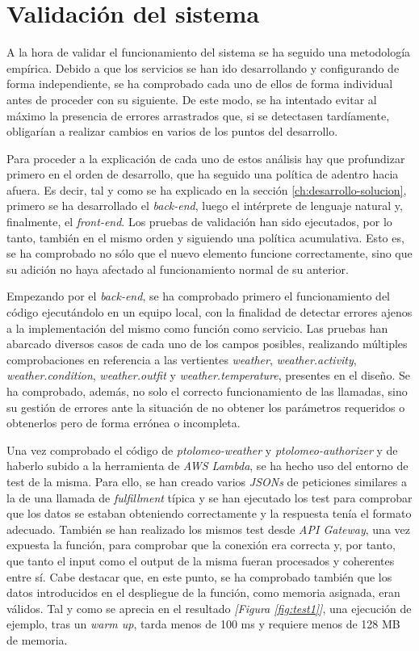 \documentclass[11pt,spanish,listoffigures]{tfgetsinf}
\begin{document}

\section{Validación del sistema}
\label{sec:validacion-sistema}

A la hora de validar el funcionamiento del sistema se ha seguido una metodología empírica. Debido a que los servicios se han ido desarrollando y configurando de forma independiente, se ha comprobado cada uno de ellos de forma individual antes de proceder con su siguiente. De este modo, se ha intentado evitar al máximo la presencia de errores arrastrados que, si se detectasen tardíamente, obligarían a realizar cambios en varios de los puntos del desarrollo.

Para proceder a la explicación de cada uno de estos análisis hay que profundizar primero en el orden de desarrollo, que ha seguido una política de adentro hacia afuera. Es decir, tal y como se ha explicado en la sección \ref{ch:desarrollo-solucion}, primero se ha desarrollado el \textit{back-end}, luego el intérprete de lenguaje natural y, finalmente, el \textit{front-end}. Los pruebas de validación han sido ejecutados, por lo tanto, también en el mismo orden y siguiendo una política acumulativa. Esto es, se ha comprobado no sólo que el nuevo elemento funcione correctamente, sino que su adición no haya afectado al funcionamiento normal de su anterior.

Empezando por el \textit{back-end}, se ha comprobado primero el funcionamiento del código ejecutándolo en un equipo local, con la finalidad de detectar errores ajenos a la implementación del mismo como función como servicio. Las pruebas han abarcado diversos casos de cada uno de los campos posibles, realizando múltiples comprobaciones en referencia a las vertientes \textit{weather}, \textit{weather.activity}, \textit{weather.condition}, \textit{weather.outfit} y \textit{weather.temperature}, presentes en el diseño. Se ha comprobado, además, no solo el correcto funcionamiento de las llamadas, sino su gestión de errores ante la situación de no obtener los parámetros requeridos o obtenerlos pero de forma errónea o incompleta. 

Una vez comprobado el código de \textit{ptolomeo-weather} y \textit{ptolomeo-authorizer} y de haberlo subido a la herramienta de \textit{AWS Lambda}, se ha hecho uso del entorno de test de la misma. Para ello, se han creado varios \textit{JSONs} de peticiones similares a la de una llamada de \textit{fulfillment} típica y se han ejecutado los test para comprobar que los datos se estaban obteniendo correctamente y la respuesta tenía el formato adecuado. También se han realizado los mismos test desde \textit{API Gateway}, una vez expuesta la función, para comprobar que la conexión era correcta y, por tanto, que tanto el input como el output de la misma fueran procesados y coherentes entre sí. Cabe destacar que, en este punto, se ha comprobado también que los datos introducidos en el despliegue de la función, como memoria asignada, eran válidos. Tal y como se aprecia en el resultado \textit{[Figura \ref{fig:test1}]}, una ejecución de ejemplo, tras un \textit{warm up}, tarda menos de 100 ms y requiere menos de 128 MB de memoria.  
\end{document}
